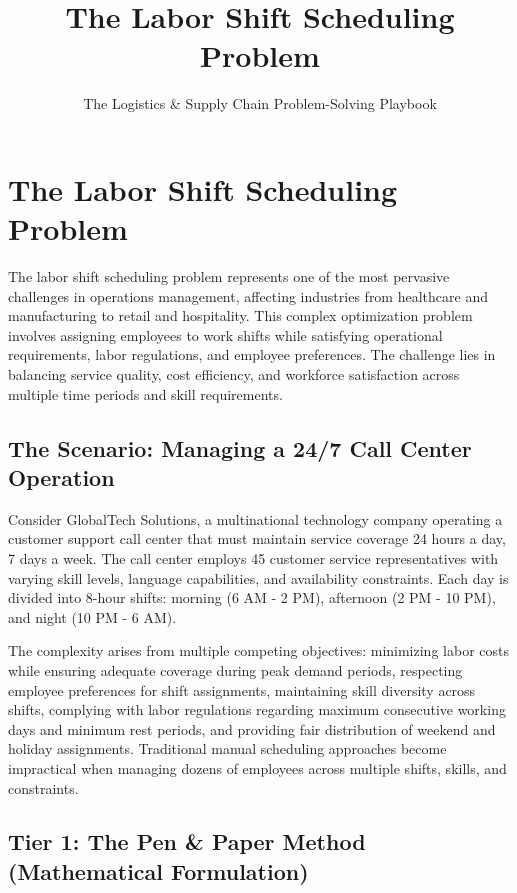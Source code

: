 \documentclass{article}
\title{The Labor Shift Scheduling Problem}
\author{The Logistics \& Supply Chain Problem-Solving Playbook}
\date{}
\begin{document}
\maketitle

\section{The Labor Shift Scheduling Problem}

The labor shift scheduling problem represents one of the most pervasive challenges in operations management, affecting industries from healthcare and manufacturing to retail and hospitality. This complex optimization problem involves assigning employees to work shifts while satisfying operational requirements, labor regulations, and employee preferences. The challenge lies in balancing service quality, cost efficiency, and workforce satisfaction across multiple time periods and skill requirements.

\subsection{The Scenario: Managing a 24/7 Call Center Operation}

Consider GlobalTech Solutions, a multinational technology company operating a customer support call center that must maintain service coverage 24 hours a day, 7 days a week. The call center employs 45 customer service representatives with varying skill levels, language capabilities, and availability constraints. Each day is divided into 8-hour shifts: morning (6 AM - 2 PM), afternoon (2 PM - 10 PM), and night (10 PM - 6 AM).

The complexity arises from multiple competing objectives: minimizing labor costs while ensuring adequate coverage during peak demand periods, respecting employee preferences for shift assignments, maintaining skill diversity across shifts, complying with labor regulations regarding maximum consecutive working days and minimum rest periods, and providing fair distribution of weekend and holiday assignments. Traditional manual scheduling approaches become impractical when managing dozens of employees across multiple shifts, skills, and constraints.

\subsection{Tier 1: The Pen \& Paper Method (Mathematical Formulation)}
\end{document}
